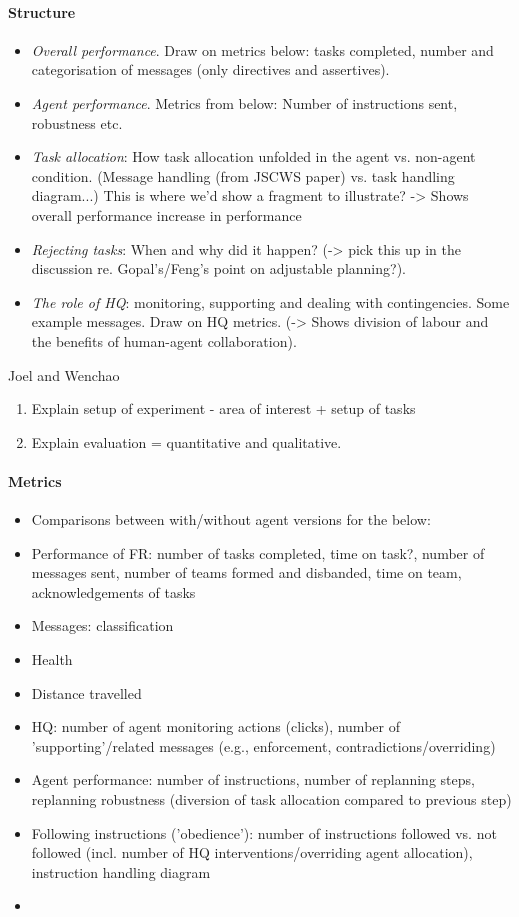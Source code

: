 \paragraph{Structure}
\begin{itemize}
\item  \textit{Overall performance}. Draw on metrics below: tasks completed, number and categorisation of messages (only directives and assertives). 
\item \textit{Agent performance}. Metrics from below: Number of instructions sent, robustness etc. 
\item \textit{Task allocation}: How task allocation unfolded in the agent vs. non-agent condition. (Message handling (from JSCWS paper) vs. task handling diagram...) This is where we'd show a fragment to illustrate? -> Shows overall performance increase in performance
\item \textit{Rejecting tasks}: When and why did it happen? (-> pick this up in the discussion re. Gopal's/Feng's point on adjustable planning?). 
\item \textit{The role of HQ}: monitoring, supporting and dealing with contingencies. Some example messages. Draw on HQ metrics. (-> Shows division of labour and the benefits of human-agent collaboration).
\end{itemize} 
 
Joel and Wenchao
\begin{enumerate}
\item Explain setup of experiment - area of interest + setup of tasks
\item Explain evaluation = quantitative and qualitative.
\end{enumerate}
\paragraph{Metrics}
\begin{itemize}
\item{Comparisons between with/without agent versions for the below:}
\item{Performance of FR: number of tasks completed, time on task?, number of messages sent, number of teams formed and disbanded, time on team, acknowledgements of tasks}
\item{Messages: classification}
\item{Health}
\item{Distance travelled}
\item{HQ: number of agent monitoring actions (clicks), number of 'supporting'/related messages (e.g., enforcement, contradictions/overriding)}
\item{Agent performance: number of instructions, number of replanning steps, replanning robustness (diversion of task allocation compared to previous step)}
\item{Following instructions ('obedience'): number of instructions followed vs. not followed (incl. number of HQ interventions/overriding agent allocation), instruction handling diagram}
\item
\end{itemize}
